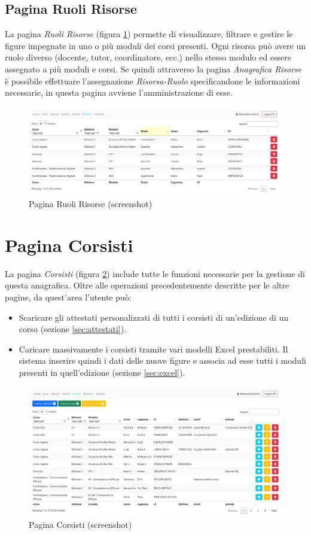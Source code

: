 \subsection{Pagina Ruoli Risorse}
La pagina \textit{Ruoli Risorse} (figura \ref{fig:ruoli}) permette di visualizzare, filtrare e gestire le figure impegnate in uno o più moduli dei corsi presenti. Ogni risorsa può avere un ruolo diverso (docente, tutor, coordinatore, ecc.) nello stesso modulo ed essere assegnato a più moduli e corsi. Se quindi attraverso la pagina \textit{Anagrafica Risorse} è possibile effettuare l'assegnazione \textit{Risorsa-Ruolo} specificandone le informazioni necessarie, in questa pagina avviene l'amministrazione di esse.
\begin{figure}[!hbt]
\centering
\includegraphics[scale=0.40]{img/screen/Ruoli-1.jpg}
\caption{Pagina Ruoli Risorse (screenshot)}
\label{fig:ruoli}
\end{figure}
\newline
\section{Pagina Corsisti}
La pagina \textit{Corsisti} (figura \ref{fig:corsisti}) include tutte le funzioni necessarie per la gestione di questa anagrafica. Oltre alle operazioni precedentemente descritte per le altre pagine, da quest'area l'utente può:
\begin{itemize}
  \item Scaricare gli attestati personalizzati di tutti i corsisti di un'edizione di un corso (sezione \ref{sec:attestati}).
  \item Caricare massivamente i corsisti tramite vari modelli Excel prestabiliti. Il sistema inserire quindi i dati delle nuove figure e associa ad esse tutti i moduli presenti in quell'edizione (sezione \ref{sec:excel}).
\end{itemize}
\noindent
\begin{figure}[!h]
\centering
\includegraphics[scale=0.40]{img/screen/Corsisti-1.jpg}
\caption{Pagina Corsisti (screenshot)}
\label{fig:corsisti}
\end{figure}
\noindent
